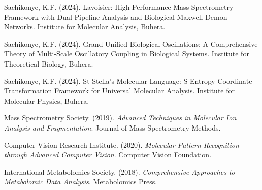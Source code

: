 \documentclass[12pt,a4paper]{article}
\begin{document}
\begin{thebibliography}{99}

Sachikonye, K.F. (2024). Lavoisier: High-Performance Mass Spectrometry Framework with Dual-Pipeline Analysis and Biological Maxwell Demon Networks. Institute for Molecular Analysis, Buhera.

Sachikonye, K.F. (2024). Grand Unified Biological Oscillations: A Comprehensive Theory of Multi-Scale Oscillatory Coupling in Biological Systems. Institute for Theoretical Biology, Buhera.

Sachikonye, K.F. (2024). St-Stella's Molecular Language: S-Entropy Coordinate Transformation Framework for Universal Molecular Analysis. Institute for Molecular Physics, Buhera.

Mass Spectrometry Society. (2019). \textit{Advanced Techniques in Molecular Ion Analysis and Fragmentation}. Journal of Mass Spectrometry Methods.

Computer Vision Research Institute. (2020). \textit{Molecular Pattern Recognition through Advanced Computer Vision}. Computer Vision Foundation.

International Metabolomics Society. (2018). \textit{Comprehensive Approaches to Metabolomic Data Analysis}. Metabolomics Press.

\end{thebibliography}
\end{document}
